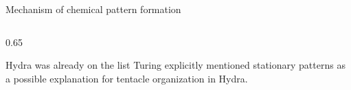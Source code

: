 \begin{frame}{Mechanism of chemical pattern formation}
\begin{columns}[c,onlytextwidth]
\begin{column}{0.65\textwidth}
      \vspace{0.18cm}

      \HydraPoint
        {Hydra was already on the list}
        {Turing explicitly mentioned stationary patterns as a possible explanation for tentacle organization in Hydra.}

    \end{column}

  \end{columns}

  \vspace{0.15cm}

  

\end{frame}

